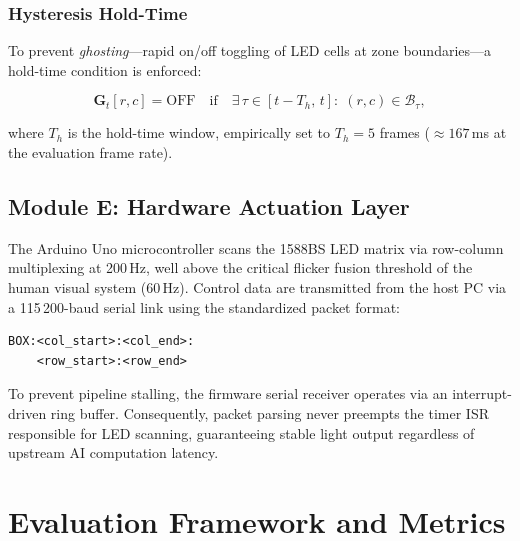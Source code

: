 \documentclass{jstarticle}
\theoremstyle{remark}
\begin{document}
\subsubsection{Hysteresis Hold-Time}

To prevent \emph{ghosting}---rapid on/off toggling of LED cells at
zone boundaries---a hold-time condition is enforced:

\begin{equation}
\mathbf{G}_t[r,c] = \text{OFF}
\quad \text{if} \quad
\exists\, \tau \in [t-T_h,\,t]\!:\;
(r,c) \in \mathcal{B}_\tau,
\label{eq:hysteresis}
\end{equation}

\noindent where $T_h$ is the hold-time window, empirically set to
$T_h = 5$ frames (${\approx}167$\,ms at the evaluation frame rate).

\subsection{Module E: Hardware Actuation Layer}
\label{subsec:hw}

The Arduino Uno microcontroller scans the 1588BS LED matrix via
row-column multiplexing at 200\,Hz, well above the critical flicker
fusion threshold of the human visual system (60\,Hz). Control data
are transmitted from the host PC via a 115\,200-baud serial link
using the standardized packet format:

\begin{center}
\begin{verbatim}
BOX:<col_start>:<col_end>:
    <row_start>:<row_end>
\end{verbatim}
\end{center}

\noindent To prevent pipeline stalling, the firmware serial receiver
operates via an interrupt-driven ring buffer. Consequently, packet
parsing never preempts the timer ISR responsible for LED scanning,
guaranteeing stable light output regardless of upstream AI computation
latency.

\section{Evaluation Framework and Metrics}
\label{sec:eval}
\end{document}
